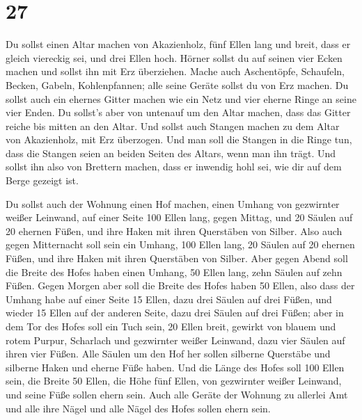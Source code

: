 \hypertarget{section-26}{%
\section{27}\label{section-26}}

 Du sollst einen Altar machen von Akazienholz, fünf Ellen
lang und breit, dass er gleich viereckig sei, und drei Ellen hoch.
 Hörner sollst du auf seinen vier Ecken machen und sollst
ihn mit Erz überziehen.  Mache auch Aschentöpfe,
Schaufeln, Becken, Gabeln, Kohlenpfannen; alle seine Geräte sollst du
von Erz machen.  Du sollst auch ein ehernes Gitter machen
wie ein Netz und vier eherne Ringe an seine vier Enden. 
Du sollst's aber von untenauf um den Altar machen, dass das Gitter
reiche bis mitten an den Altar.  Und sollst auch Stangen
machen zu dem Altar von Akazienholz, mit Erz überzogen. 
Und man soll die Stangen in die Ringe tun, dass die Stangen seien an
beiden Seiten des Altars, wenn man ihn trägt.  Und sollst
ihn also von Brettern machen, dass er inwendig hohl sei, wie dir auf dem
Berge gezeigt ist.

 Du sollst auch der Wohnung einen Hof machen, einen Umhang
von gezwirnter weißer Leinwand, auf einer Seite 100 Ellen lang, gegen
Mittag,  und 20 Säulen auf 20 ehernen Füßen, und ihre
Haken mit ihren Querstäben von Silber.  Also auch gegen
Mitternacht soll sein ein Umhang, 100 Ellen lang, 20 Säulen auf 20
ehernen Füßen, und ihre Haken mit ihren Querstäben von Silber.
 Aber gegen Abend soll die Breite des Hofes haben einen
Umhang, 50 Ellen lang, zehn Säulen auf zehn Füßen.  Gegen
Morgen aber soll die Breite des Hofes haben 50 Ellen, 
also dass der Umhang habe auf einer Seite 15 Ellen, dazu drei Säulen auf
drei Füßen,  und wieder 15 Ellen auf der anderen Seite,
dazu drei Säulen auf drei Füßen;  aber in dem Tor des
Hofes soll ein Tuch sein, 20 Ellen breit, gewirkt von blauem und rotem
Purpur, Scharlach und gezwirnter weißer Leinwand, dazu vier Säulen auf
ihren vier Füßen.  Alle Säulen um den Hof her sollen
silberne Querstäbe und silberne Haken und eherne Füße haben.
 Und die Länge des Hofes soll 100 Ellen sein, die Breite
50 Ellen, die Höhe fünf Ellen, von gezwirnter weißer Leinwand, und seine
Füße sollen ehern sein.  Auch alle Geräte der Wohnung zu
allerlei Amt und alle ihre Nägel und alle Nägel des Hofes sollen ehern
sein.


